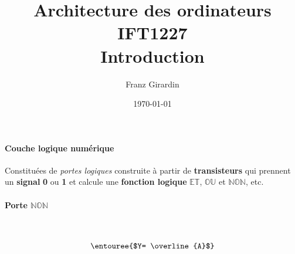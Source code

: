 \documentclass{report}
\title{\Huge{Architecture des ordinateurs}\\{IFT1227}\\{\textbf{Introduction}}}
\author{\huge{Franz Girardin}}
\date{\today}
\begin{document}
\maketitle

\pagebreak

\pagebreak
\begin{multicols*}{3}


    \footnotesize


    \paragraph{Couche logique numérique}  
    Constituées de \textit{portes logiques} construite à partir 
    de \textbf{transisteurs} qui prennent un \textbf{signal}
    \textbf{0} ou \textbf{1} et calcule 
    une \textbf{fonction logique} 
    $\mathbb{ET}$, $\mathbb{OU}$ et $\mathbb{NON}$, etc.

    \paragraph{Porte $\mathbb{NON}$}
    \mbox{}\vspace{1em}\\
    \begin{minipage}{\columnwidth}
        \begin{minipage}[b]{0.5\columnwidth}
            \centering
            \notgate
        \end{minipage}%
        \begin{minipage}[b]{0.5\columnwidth}
            \centering
        \end{minipage}
    \end{minipage}
    \[\entouree{$Y= \overline{A}$} \]



\end{multicols*}
\end{document}
